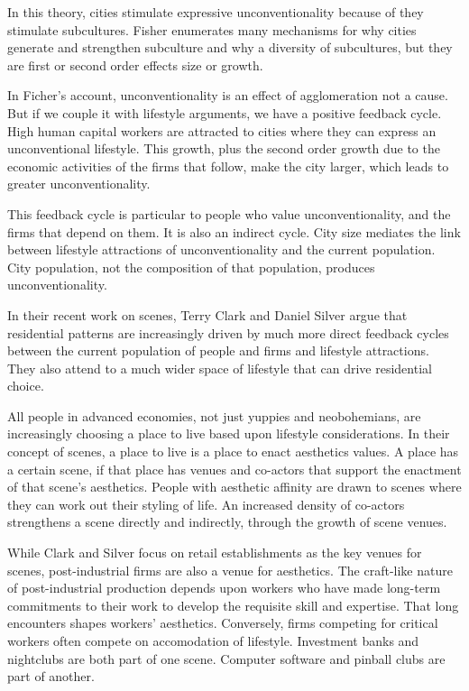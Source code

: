 In this theory, cities stimulate expressive unconventionality because
of they stimulate subcultures. Fisher enumerates many mechanisms for
why cities generate and strengthen subculture and why a diversity of
subcultures, but they are first or second order effects size or
growth.\cite{fischer_subcultural_1995}

In Ficher's account, unconventionality is an effect of agglomeration
not a cause. But if we couple it with lifestyle arguments, we have a
positive feedback cycle. High human capital workers are attracted to
cities where they can express an unconventional lifestyle. This
growth, plus the second order growth due to the economic activities of
the firms that follow, make the city larger, which leads to greater
unconventionality. 

This feedback cycle is particular to people who value
unconventionality, and the firms that depend on them. It is also an
indirect cycle. City size mediates the link between lifestyle
attractions of unconventionality and the current population. City
population, not the composition of that population, produces
unconventionality. 

In their recent work on scenes, Terry Clark and Daniel Silver
argue that residential patterns are increasingly driven by much more
direct feedback cycles between the current population of people and
firms and lifestyle attractions. They also attend to a much wider
space of lifestyle that can drive residential choice.\cite{silver_scenescapes_2016}

All people in advanced economies, not just yuppies and neobohemians,
are increasingly choosing a place to live based upon lifestyle
considerations. In their concept of scenes, a place to live is a place
to enact aesthetics values. A place has a certain scene, if that place
has venues and co-actors that support the enactment of that scene's
aesthetics. People with aesthetic affinity are drawn to scenes where
they can work out their styling of life. An increased density of
co-actors strengthens a scene directly and indirectly, through the
growth of scene venues.

While Clark and Silver focus on retail establishments as the key
venues for scenes, post-industrial firms are also a venue for
aesthetics. The craft-like nature of post-industrial production
depends upon workers who have made long-term commitments to their work
to develop the requisite skill and expertise. That long encounters
shapes workers' aesthetics. Conversely, firms competing for critical
workers often compete on accomodation of lifestyle. Investment banks
and nightclubs are both part of one scene. Computer software and
pinball clubs are part of another.

